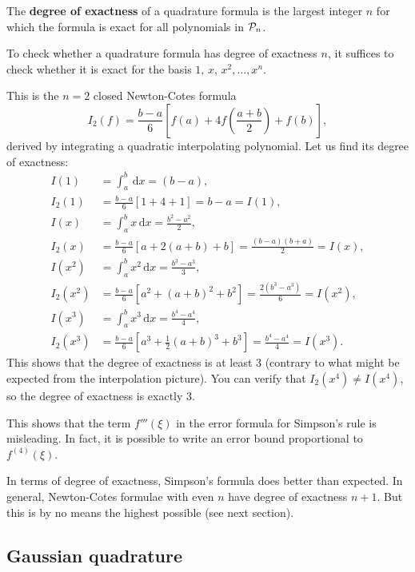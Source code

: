 \documentclass[
  letterpaper,
  DIV=11,
  numbers=noendperiod]{scrreprt}
\newenvironment{fbxSimple}[3]{\begin{tcolorbox}[enhanced, breakable,%
attach boxed title to top*={xshift=1.4pt},
boxed title style={boxrule=0.0mm, fuzzy shadow={1pt}{-1pt}{0mm}{0.1mm}{gray}, arc=.3em, rounded corners=east, sharp corners=west}, colframe=#1-color2, colbacktitle=#1-color1, colback = white, coltitle=black,  titlerule=0mm, toprule=0pt, bottomrule=.7pt, leftrule=.3em, rightrule=.7pt, outer arc=.3em,  	left=.5em, right=.5em, bottomtitle=1mm, toptitle=1mm,title=\textbf{#2}\hspace{0.5em}{#3}]}
{\end{tcolorbox}}
\begin{document}
The \textbf{degree of exactness} of a quadrature formula is the largest
integer \(n\) for which the formula is exact for all polynomials in
\({\cal P}_n\).

To check whether a quadrature formula has degree of exactness \(n\), it
suffices to check whether it is exact for the basis \(1\), \(x\),
\(x^2, \ldots, x^n\).

\label{simpsons-rule}
\begin{fbxSimple}{eg}{Example 4.12: }{Simpson’s rule}
\label{simpsons-rule}
This is the \(n=2\) closed Newton-Cotes formula \[
I_2(f) = \frac{b-a}{6}\left[f(a) + 4f\left(\frac{a+b}{2}\right) + f(b)\right],
\] derived by integrating a quadratic interpolating polynomial. Let us
find its degree of exactness: \[
\begin{aligned}
I(1) &= \int_a^b\,\mathrm{d}x = (b-a), \\
I_2(1) &= \frac{b-a}{6}[1 + 4 + 1] = b-a = I(1),\\
I(x) &= \int_a^b x\,\mathrm{d}x = \frac{b^2-a^2}{2}, \\
I_2(x) &= \frac{b-a}{6}\left[a + 2(a+b) + b\right] = \frac{(b-a)(b+a)}{2} = I(x),\\
I(x^2) &= \int_a^b x^2\,\mathrm{d}x = \frac{b^3 - a^3}{3}, \\
I_2(x^2) &= \frac{b-a}{6}\left[a^2 + (a+b)^2 + b^2\right] = \frac{2(b^3 - a^3)}{6} = I(x^2),\\
I(x^3) &= \int_a^b x^3\,\mathrm{d}x = \frac{b^4 - a^4}{4}, \\
I_2(x^3) &= \frac{b-a}{6}\left[a^3 + \tfrac12(a+b)^3 + b^3 \right] = \frac{b^4-a^4}{4} = I(x^3).
\end{aligned}
\] This shows that the degree of exactness is at least 3 (contrary to
what might be expected from the interpolation picture). You can verify
that \(I_2(x^4)\neq I(x^4)\), so the degree of exactness is exactly 3.

\end{fbxSimple}

This shows that the term \(f'''(\xi)\) in the error formula for
Simpson's rule is misleading. In fact, it is possible to write an error
bound proportional to \(f^{(4)}(\xi)\).

In terms of degree of exactness, Simpson's formula does better than
expected. In general, Newton-Cotes formulae with even \(n\) have degree
of exactness \(n+1\). But this is by no means the highest possible (see
next section).

\subsection{Gaussian quadrature}\label{gaussian-quadrature}
\end{document}

